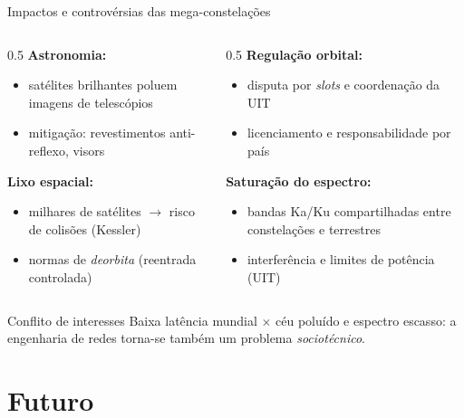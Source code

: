 \documentclass[aspectratio=169,11pt]{beamer}
\begin{document}
\begin{frame}{Impactos e controvérsias das mega-constelações}
  \begin{columns}
    \begin{column}{0.5\textwidth}
      \textbf{Astronomia:}
      \begin{itemize}
        \item satélites brilhantes poluem imagens de telescópios
        \item mitigação: revestimentos anti-reflexo, visors
      \end{itemize}
      \textbf{Lixo espacial:}
      \begin{itemize}
        \item milhares de satélites $\rightarrow$ risco de colisões (Kessler)
        \item normas de \emph{deorbita} (reentrada controlada)
      \end{itemize}
    \end{column}
    \begin{column}{0.5\textwidth}
      \textbf{Regulação orbital:}
      \begin{itemize}
        \item disputa por \emph{slots} e coordenação da UIT
        \item licenciamento e responsabilidade por país
      \end{itemize}
      \textbf{Saturação do espectro:}
      \begin{itemize}
        \item bandas Ka/Ku compartilhadas entre constelações e terrestres
        \item interferência e limites de potência (UIT)
      \end{itemize}
    \end{column}
  \end{columns}
  \begin{alertblock}{Conflito de interesses}
    Baixa latência mundial $\times$ céu poluído e espectro escasso: a engenharia de redes torna-se também um problema \emph{sociotécnico}.
  \end{alertblock}
\end{frame}

\section{Futuro}
\end{document}
